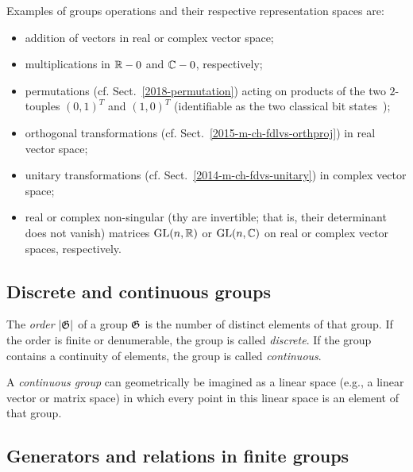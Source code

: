 {
\color{blue}
\bexample
Examples of groups operations and their respective representation spaces are:
\begin{itemize}
\item
addition of vectors in real or complex vector space;

\item
multiplications in ${\Bbb R} - {0}$ and ${\Bbb C} - {0}$, respectively;

\item
permutations (cf. Sect.~\ref{2018-permutation})
acting on products of the two $2$-touples
$(0,1)^T$ and
$(1,0)^T$
(identifiable as the two classical bit states~\cite{mermin-07});


\item
orthogonal transformations
 (cf. Sect.~\ref{2015-m-ch-fdlvs-orthproj})
in real  vector space;

\item
unitary transformations
 (cf. Sect.~\ref{2014-m-ch-fdvs-unitary})
in  complex vector space;

\item
real or complex non-singular (thy are invertible; that is, their determinant does not vanish)
matrices $\textrm{GL}(n,{\Bbb R})$ or $\textrm{GL}(n,{\Bbb C})$ on real or complex vector spaces, respectively.

\end{itemize}

\eexample
}


\subsection{Discrete and continuous groups}

The {\em order} $\vert {\frak G} \vert$ of a group ${\frak G}$ is the number of distinct elements of that group.
If the order is finite or denumerable, the group is called {\em discrete}.
If the group contains a continuity of elements, the group is called {\em continuous}.

A {\em continuous group} can geometrically be imagined as a linear  space  (e.g., a linear vector or matrix space)
in which every point in this linear space is an element of that group.




\subsection{Generators and relations in finite groups}

